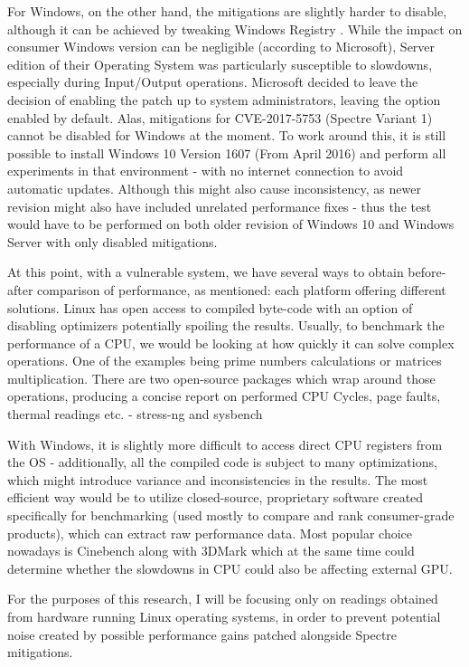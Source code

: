 \documentclass{csfourzero}
\begin{document}
For Windows, on the other hand, the mitigations are slightly harder to disable, although it can be achieved by tweaking Windows Registry \cite{msoft}. While the impact on consumer Windows version can be negligible (according to Microsoft\cite{myerson2018understanding}), Server edition of their Operating System was particularly susceptible to slowdowns, especially during Input/Output operations. Microsoft decided to leave the decision of enabling the patch up to system administrators, leaving the option enabled by default. Alas, mitigations for CVE-2017-5753 (Spectre Variant 1) cannot be disabled for Windows at the moment. To work around this, it is still possible to install Windows 10 Version 1607 (From April 2016) and perform all experiments in that environment - with no internet connection to avoid automatic updates. Although this might also cause inconsistency, as newer revision might also have included unrelated performance fixes - thus the test would have to be performed on both older revision of Windows 10 and Windows Server with only disabled mitigations.

At this point, with a vulnerable system, we have several ways to obtain before-after comparison of performance, as mentioned: each platform offering different solutions. Linux has open access to compiled byte-code with an option of disabling optimizers potentially spoiling the results. Usually, to benchmark the performance of a CPU, we would be looking at how quickly it can solve complex operations. One of the examples being prime numbers calculations or matrices multiplication. There are two open-source packages which wrap around those operations, producing a concise report on performed CPU Cycles, page faults, thermal readings etc. - stress-ng \cite{stressng} and sysbench \cite{sysbench}  

With Windows, it is slightly more difficult to access direct CPU registers from the OS - additionally, all the compiled code is subject to many optimizations, which might introduce variance and inconsistencies in the results. The most efficient way would be to utilize closed-source, proprietary software created specifically for benchmarking (used mostly to compare and rank consumer-grade products), which can extract raw performance data. Most popular choice nowadays is Cinebench along with 3DMark which at the same time could determine whether the slowdowns in CPU could also be affecting external GPU.

For the purposes of this research, I will be focusing only on readings obtained from hardware running Linux operating systems, in order to prevent potential noise created by possible performance gains patched alongside Spectre mitigations.
\end{document}
